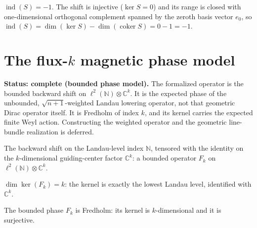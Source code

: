 \begin{theorem}
  \label{thm:fredholmIndex-shift}
  \leanok
  $\operatorname{ind}(S) = -1$. The shift is injective ($\ker S = 0$) and its range is closed
  with one-dimensional orthogonal complement spanned by the zeroth basis vector $e_0$, so
  $\operatorname{ind}(S) = \dim(\ker S) - \dim(\operatorname{coker} S) = 0 - 1 = -1$.
\end{theorem}

\section{The flux-\texorpdfstring{$k$}{k} magnetic phase model}
\label{sec:magnetic-dirac}

\textbf{Status: complete (bounded phase model).}  The formalized operator is the bounded
backward shift on $\ell^2(\mathbb N)\otimes\mathbb C^k$.  It is the expected phase of the
unbounded, $\sqrt{n+1}$-weighted Landau lowering operator, not that geometric Dirac operator
itself.  It is Fredholm of index $k$, and its kernel carries the expected finite Weyl action.
Constructing the weighted operator and the geometric line-bundle realization is deferred.

\begin{definition}
  \label{def:magneticDirac}
  \leanok
  The backward shift on the Landau-level index $\mathbb{N}$, tensored with the identity on the
  $k$-dimensional guiding-center factor $\mathbb{C}^k$: a bounded operator $F_k$ on
  $\ell^2(\mathbb{N}) \otimes \mathbb{C}^k$.
\end{definition}

\begin{theorem}
  \label{thm:magneticDirac-ker-finrank}
  \leanok
  $\dim \ker(F_k) = k$: the kernel is exactly the lowest Landau level, identified with
  $\mathbb{C}^k$.
\end{theorem}

\begin{theorem}
  \label{thm:isFredholm-magneticPhase}
  \leanok
  The bounded phase $F_k$ is Fredholm: its kernel is $k$-dimensional and it is surjective.
\end{theorem}


